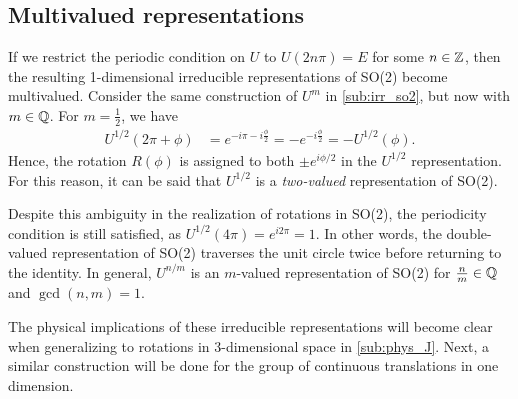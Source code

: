 
    \subsection{Multivalued representations}
    If we restrict the periodic condition on $U$ to $U(2n\pi) = E$ for some $n\in\mathbb{Z}$, then the resulting 1-dimensional irreducible representations of SO(2) become multivalued. Consider the same construction of $U^m$ in \cref{sub:irr_so2}, but now with $m\in\mathbb{Q}$. For $m=\frac{1}{2}$, we have
    \begin{align*}
        U^{1/2}(2\pi + \phi) &= e^{-i\pi -i\frac{\phi}{2}} = -e^{-i\frac{\phi}{2}} = -U^{1/2}(\phi).
    \end{align*}
    Hence, the rotation $R(\phi)$ is assigned to both $\pm e^{i\phi/2}$ in the $U^{1/2}$ representation. For this reason, it can be said that $U^{1/2}$ is a \textit{two-valued} representation of SO(2).
    
    Despite this ambiguity in the realization of rotations in SO(2), the periodicity condition is still satisfied, as $U^{1/2}(4\pi) = e^{i2\pi} = 1$. In other words, the double-valued representation of SO(2) traverses the unit circle twice before returning to the identity. In general, $U^{n/m}$ is an $m$-valued representation of SO(2) for $\frac{n}{m}\in\mathbb{Q}$ and $\gcd(n,m)=1$.
    
    The physical implications of these irreducible representations will become clear when generalizing to rotations in 3-dimensional space in \cref{sub:phys_J}. Next, a similar construction will be done for the group of continuous translations in one dimension.

